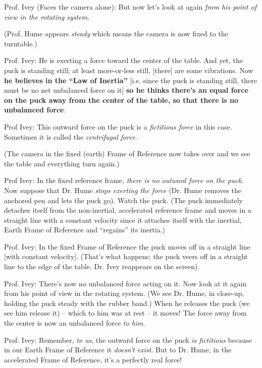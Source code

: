 \documentclass[a6paper]{article}
\begin{document}
Prof. Ivey (Faces the camera alone): But now let's look at again \emph{from his point of view in the rotating system}.

(Prof. Hume appears \emph{steady} which means the camera is now fixed to the turntable.)

Prof. Ivey: He is exerting a force toward the center of the table. And yet, the puck is standing still; at least more-or-less still, [there] are some vibrations. Now \textbf{he believes in the ``Law of Inertia''} [i.e. since the puck is standing still, there must be no net unbalanced force on it] \textbf{so he thinks there's an equal force on the puck away from the center of the table, so that there is no unbalanced force}.

Prof Ivey: This outward force on the puck is a \emph{fictitious force} in this case. Sometimes it is called the \emph{centrifugal force}. 

(The camera in the fixed (earth) Frame of Reference now takes over and we see the table and everything turn again.) 

Prof Ivey: In the fixed reference frame, \emph{there is no outward force on the puck}. Now suppose that Dr. Hume \emph{stops exerting the force} (Dr. Hume removes the anchored pen and lets the puck go). Watch the puck. (The puck immediately detaches itself from the non-inertial, accelerated reference frame and moves in a straight line with a constant velocity since it attaches itself with the inertial, Earth Frame of Reference and ``regains'' its inertia.)

Prof. Ivey: In the fixed Frame of Reference the puck moves off in a straight line [with constant velocity]. (That's what happens; the puck veers off in a straight line to the edge of the table. Dr. Ivey reappears on the screen). 

Prof. Ivey: There's now no unbalanced force acting on it. Now look at it again from his point of view in the rotating system. (We see Dr. Hume, in close-up, holding the puck steady with the rubber band.) When he releases the puck (we see him release it) -- which to him was at rest -- it moves! The force away from the center is now an unbalanced force \emph{to him}.

Prof. Ivey: Remember, \emph{to us}, the outward force on the puck \emph{is fictitious} because in our Earth Frame of Reference it \emph{doesn't exist}. But to Dr. Hume, in the accelerated Frame of Reference, it's a perfectly real force!
\end{document}

